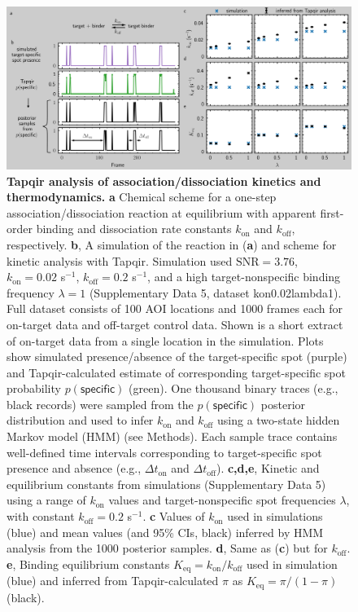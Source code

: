\begin{figure}[h]
\centering
\includegraphics[width=\textwidth]{figures/figure6.png}
\caption{\textbf{Tapqir analysis of association/dissociation kinetics and thermodynamics.} \textbf{a} Chemical scheme for a one-step association/dissociation reaction at equilibrium with apparent first-order binding and dissociation rate constants $k_{\mathrm{on}}$ and $k_{\mathrm{off}}$, respectively. \textbf{b}, A simulation of the reaction in (\textbf{a}) and scheme for kinetic analysis with Tapqir. Simulation used $\mathrm{SNR} = 3.76$, $k_\mathrm{on} = 0.02$ s$^{-1}$, $k_\mathrm{off} = 0.2$ s$^{-1}$, and a high target-nonspecific binding frequency $\lambda = 1$ (Supplementary Data 5, dataset kon0.02lambda1). Full dataset consists of 100 AOI locations and 1000 frames each for on-target data and off-target control data. Shown is a short extract of on-target data from a single location in the simulation.  Plots show simulated presence/absence of the target-specific spot (purple) and Tapqir-calculated estimate of corresponding target-specific spot probability $p(\mathsf{specific})$ (green). One thousand binary traces (e.g., black records) were sampled from the $p(\mathsf{specific})$ posterior distribution and used to infer $k_\mathrm{on}$ and $k_\mathrm{off}$ using a two-state hidden Markov model (HMM) (see Methods). Each sample trace contains well-defined time intervals corresponding to target-specific spot presence and absence (e.g., $\Delta t_\mathrm{on}$ and $\Delta t_\mathrm{off}$). \textbf{c,d,e}, Kinetic and equilibrium constants from simulations (Supplementary Data 5) using a range of $k_\mathrm{on}$ values and  target-nonspecific spot frequencies $\lambda$, with constant $k_\mathrm{off} = 0.2$ s$^{-1}$. \textbf{c} Values of $k_{\mathrm{on}}$ used in simulations (blue) and mean values (and 95\% CIs, black) inferred by HMM analysis from the 1000 posterior samples. \textbf{d}, Same as (\textbf{c}) but for $k_{\mathrm{off}}$. \textbf{e},  Binding equilibrium constants $K_{\mathrm{eq}} = k_{\mathrm{on}} / k_{\mathrm{off}}$ used in simulation (blue) and inferred from Tapqir-calculated $\pi$ as $K_{\mathrm{eq}} = \pi / (1 - \pi)$ (black). }
\label{fig:kinetic_analysis}
\end{figure}
\clearpage
\pagebreak

